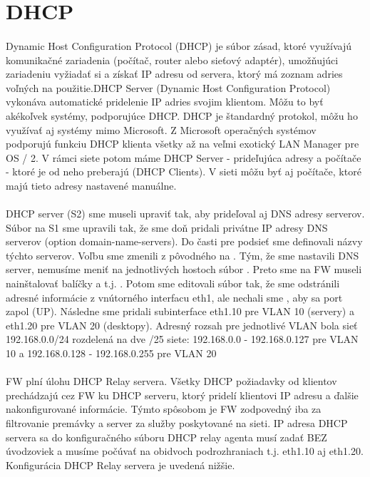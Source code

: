 \section{DHCP}
\paragraph{}
Dynamic Host Configuration Protocol (DHCP) je súbor zásad, ktoré využívajú komunikačné zariadenia (počítač, router alebo sieťový adaptér), umožňujúci zariadeniu vyžiadať si a získať IP adresu od servera, ktorý má zoznam adries voľných na použitie.DHCP Server (Dynamic Host Configuration Protocol) vykonáva automatické pridelenie IP adries svojim klientom. Môžu to byť akékoľvek systémy, podporujúce DHCP. DHCP je štandardný protokol, môžu ho využívať aj systémy mimo Microsoft. Z Microsoft operačných systémov podporujú funkciu DHCP klienta všetky až na veľmi exotický LAN Manager pre OS / 2. V rámci siete potom máme DHCP Server - prideľujúca adresy a počítače - ktoré je od neho preberajú (DHCP Clients). V sieti môžu byť aj počítače, ktoré majú tieto adresy nastavené manuálne.

\paragraph{}
DHCP server (S2) sme museli upraviť tak, aby prideľoval aj DNS adresy serverov. Súbor  na S1 sme upravili tak, že sme doň pridali privátne IP adresy DNS serverov (option domain-name-servers). Do časti pre podsieť sme definovali názvy týchto serverov. Voľbu  sme zmenili z pôvodného  na . Tým, že sme nastavili DNS server, nemusíme meniť na jednotlivých hostoch súbor .
Preto sme na FW museli nainštalovať balíčky  a  t.j. . Potom sme editovali súbor  tak, že sme odstránili adresné informácie z vnútorného interfacu eth1, ale nechali sme , aby sa port zapol (UP). Následne sme pridali subinterface eth1.10 pre VLAN 10 (servery) a eth1.20 pre VLAN 20 (desktopy). Adresný rozsah pre jednotlivé VLAN bola sieť 192.168.0.0/24 rozdelená na dve /25 siete: 192.168.0.0 - 192.168.0.127 pre VLAN 10 a 192.168.0.128 - 192.168.0.255 pre VLAN 20

\paragraph{}
FW plní úlohu DHCP Relay servera. Všetky DHCP požiadavky od klientov prechá\-dzajú cez FW ku DHCP serveru, ktorý pridelí klientovi IP adresu a ďalšie nakonfigurované informácie. Týmto spôsobom je FW zodpovedný iba za filtrovanie premávky a server za služby poskytované na sieti. IP adresa DHCP servera sa do konfiguračného súboru  DHCP relay agenta musí zadať BEZ úvodzoviek a musíme počúvať na obidvoch podrozhraniach t.j. eth1.10 aj eth1.20. Konfigurácia DHCP Relay servera je uvedená nižšie.

